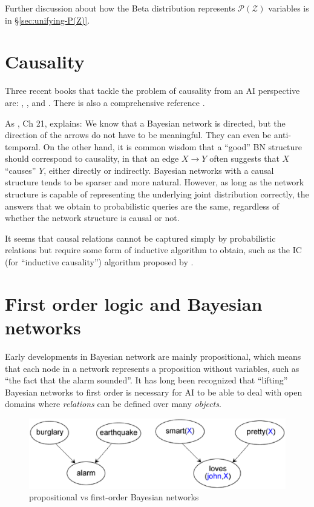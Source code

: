 Further discussion about how the Beta distribution represents $\mathcal{P(Z)}$ variables is in \S\ref{sec:unifying-P(Z)}.

\section{Causality}

Three recent books that tackle the problem of causality from an AI perspective are: \citep*{Shafer1996}, \citep*{Pearl2000}, and \citep*{Williamson2005}.  There is also a comprehensive reference \citep*{Beebee2009}.

As \citep*{Koller2009}, Ch 21, explains:  We know that a Bayesian network is directed, but the direction of the arrows do not have to be meaningful.  They can even be anti-temporal.  On the other hand, it is common wisdom that a ``good'' BN structure should correspond to causality, in that an edge $X \rightarrow Y$ often suggests that $X$ ``causes'' $Y$, either directly or indirectly.  Bayesian networks with a causal structure tends to be sparser and more natural.  However, as long as the network structure is capable of representing the underlying joint distribution correctly, the answers that we obtain to probabilistic queries are the same, regardless of whether the network structure is causal or not.


It seems that causal relations cannot be captured simply by probabilistic relations but require some form of inductive algorithm to obtain, such as the IC (for ``inductive causality'') algorithm proposed by \citep*{Pearl2000}.

\underconst

\section{First order logic and Bayesian networks}
\label{sec:FOL-BN}

Early developments in Bayesian network are mainly propositional, which means that each node in a network represents a proposition without variables, such as ``the fact that the alarm sounded''.  It has long been recognized that ``lifting'' Bayesian networks to first order is necessary for AI to be able to deal with open domains where \emph{relations} can be defined over many \emph{objects}.

\begin{figure}[H]
\centering
\includegraphics[scale=0.7]{FirstOrderBayesNet.eps}
\caption{propositional vs first-order Bayesian networks}
\end{figure}

